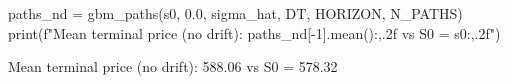 \documentclass{pyportfolios-note}
\begin{document}
\begin{notecode}
paths_nd = gbm_paths(s0, 0.0, sigma_hat, DT, HORIZON, N_PATHS)
print(f"Mean terminal price (no drift): {paths_nd[-1].mean():,.2f}   vs   S0 = {s0:,.2f}")
\end{notecode}

\begin{notecodeout}
Mean terminal price (no drift): 588.06   vs   S0 = 578.32
\end{notecodeout}

\noteneedroom{270bp}
\end{document}
